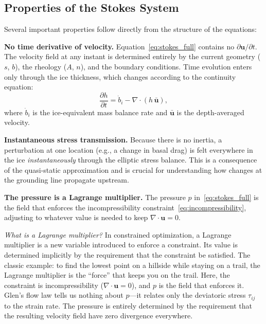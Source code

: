 \documentclass[11pt]{article}
\begin{document}
\subsection{Properties of the Stokes System}

Several important properties follow directly from the structure of the equations:

\medskip
\noindent\textbf{No time derivative of velocity.}  Equation~\eqref{eq:stokes_full} contains no $\partial \bm{u}/\partial t$.  The velocity field at any instant is determined entirely by the current geometry ($s$, $b$), the rheology ($A$, $n$), and the boundary conditions.  Time evolution enters only through the ice thickness, which changes according to the continuity equation:
\begin{equation}
  \frac{\partial h}{\partial t} = \dot{b}_i - \nabla\cdot(h\,\bar{\bm{u}}),
\end{equation}
where $\dot{b}_i$ is the ice-equivalent mass balance rate and $\bar{\bm{u}}$ is the depth-averaged velocity.

\medskip
\noindent\textbf{Instantaneous stress transmission.}  Because there is no inertia, a perturbation at one location (e.g., a change in basal drag) is felt everywhere in the ice \emph{instantaneously} through the elliptic stress balance.  This is a consequence of the quasi-static approximation and is crucial for understanding how changes at the grounding line propagate upstream.

\medskip
\noindent\textbf{The pressure is a Lagrange multiplier.}  The pressure $p$ in~\eqref{eq:stokes_full} is the field that enforces the incompressibility constraint~\eqref{eq:incompressibility}, adjusting to whatever value is needed to keep $\nabla\cdot\bm{u} = 0$.

\medskip
\noindent\emph{What is a Lagrange multiplier?}  In constrained optimization, a Lagrange multiplier is a new variable introduced to enforce a constraint.  Its value is determined implicitly by the requirement that the constraint be satisfied.  The classic example: to find the lowest point on a hillside while staying on a trail, the Lagrange multiplier is the ``force'' that keeps you on the trail.  Here, the constraint is incompressibility ($\nabla\cdot\bm{u} = 0$), and $p$ is the field that enforces it.  Glen's flow law tells us nothing about $p$---it relates only the deviatoric stress $\tau_{ij}$ to the strain rate.  The pressure is entirely determined by the requirement that the resulting velocity field have zero divergence everywhere.
\end{document}
